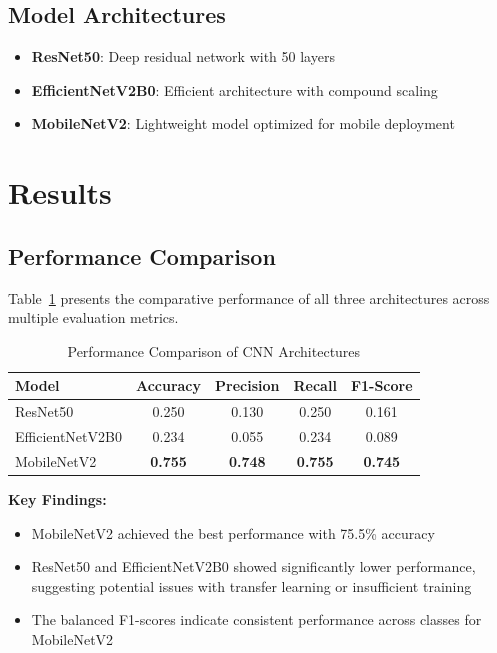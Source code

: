 \documentclass[11pt,a4paper]{article}
\begin{document}
\subsection{Model Architectures}
\begin{itemize}
    \item \textbf{ResNet50}: Deep residual network with 50 layers
    \item \textbf{EfficientNetV2B0}: Efficient architecture with compound scaling
    \item \textbf{MobileNetV2}: Lightweight model optimized for mobile deployment
\end{itemize}

\section{Results}

\subsection{Performance Comparison}

Table~\ref{tab:model_comparison} presents the comparative performance of all three architectures across multiple evaluation metrics.

\begin{table}[H]
\centering
\caption{Performance Comparison of CNN Architectures}
\label{tab:model_comparison}
\begin{tabular}{lcccc}
\toprule
\textbf{Model} & \textbf{Accuracy} & \textbf{Precision} & \textbf{Recall} & \textbf{F1-Score} \\
\midrule
ResNet50 & 0.250 & 0.130 & 0.250 & 0.161 \\
EfficientNetV2B0 & 0.234 & 0.055 & 0.234 & 0.089 \\
MobileNetV2 & \textbf{0.755} & \textbf{0.748} & \textbf{0.755} & \textbf{0.745} \\
\bottomrule
\end{tabular}
\end{table}

\textbf{Key Findings:}
\begin{itemize}
    \item MobileNetV2 achieved the best performance with 75.5\% accuracy
    \item ResNet50 and EfficientNetV2B0 showed significantly lower performance, suggesting potential issues with transfer learning or insufficient training
    \item The balanced F1-scores indicate consistent performance across classes for MobileNetV2
\end{itemize}
\end{document}
